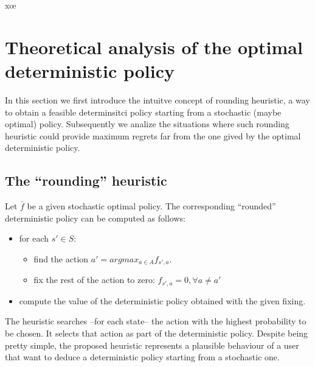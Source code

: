 xœ
\section{Theoretical analysis of the optimal deterministic policy}

In this section we first introduce the intuitve concept of rounding heuristic, a way to obtain a feasible determinsitci policy starting from a stochastic (maybe optimal) policy. Subsequently we analize the situations where such rounding heuristic could provide maximum regrets far from the one gived by the optimal deterministic policy.

\subsection{The ``rounding'' heuristic}

Let $\bar{f}$ be a given stochastic optimal policy. The corresponding ``rounded'' deterministic policy can be computed as follows:
\begin{itemize}
\item for each $s'\in S$:
\begin{itemize}
\item find the action $a' = argmax_{a \in A}f_{s',a}$.
\item fix the rest of the action to zero: $f_{s',a} =0, \forall a \neq a'$
\end{itemize}
\item compute the value of the deterministic policy obtained with the given fixing.
\end{itemize}
 
The heuristic searches --for each state-- the action with the highest probability to be chosen. It selects that action as part of the deterministic policy.
Despite being pretty simple, the proposed heuristic represents a plausible behaviour of a user that want to deduce a deterministic policy starting from a stochastic one.  
%
%
%
%
%
